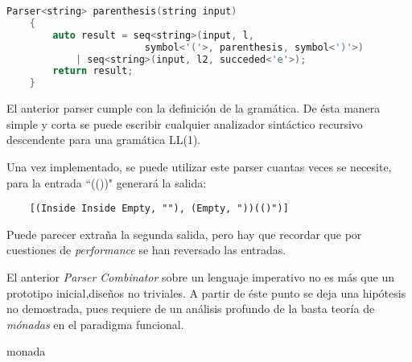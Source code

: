 	\begin{lstlisting}[language=C++, caption=utilización de los Parser combinators en C++]
	Parser<string> parenthesis(string input)
	{
		auto result = seq<string>(input, l, 
						symbol<'('>, parenthesis, symbol<')'>) 
			| seq<string>(input, l2, succeded<'e'>);
		return result;
	}		
	\end{lstlisting}
	
	El anterior parser cumple con la definición de la gramática. De ésta manera simple y corta se puede escribir cualquier analizador sintáctico recursivo descendente para una gramática LL(1).
	
	Una vez implementado, se puede utilizar este parser cuantas veces se necesite, para la entrada ``(())" generará la salida:
	\begin{lstlisting}
	[(Inside Inside Empty, ""), (Empty, "))(()")]	
	\end{lstlisting}
	
	Puede parecer extraña la segunda salida, pero hay que recordar que por cuestiones de \emph{performance} se han reversado las entradas.
	
El anterior \emph{Parser Combinator} sobre un lenguaje imperativo no es más que un prototipo inicial,diseños no triviales. A partir de éste punto se deja una hipótesis no demostrada, pues requiere de un análisis profundo de la basta teoría de \emph{mónadas} en el paradigma funcional.


\begin{conj}
	monada
\end{conj}



